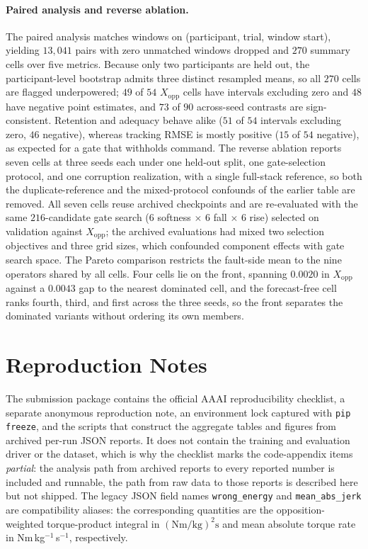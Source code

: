 \documentclass[letterpaper]{article}
\begin{document}
\paragraph{Paired analysis and reverse ablation.}
The paired analysis matches windows on (participant, trial, window start),
yielding $13{,}041$ pairs with zero unmatched windows dropped and $270$ summary
cells over five metrics. Because only two participants are held out, the
participant-level bootstrap admits three distinct resampled means, so all $270$
cells are flagged underpowered; $49$ of $54$ $X_{\mathrm{opp}}$ cells have
intervals excluding zero and $48$ have negative point estimates, and $73$ of
$90$ across-seed contrasts are sign-consistent. Retention and adequacy behave
alike ($51$ of $54$ intervals excluding zero, $46$ negative), whereas tracking
RMSE is mostly positive ($15$ of $54$ negative), as expected for a gate that
withholds command. The reverse ablation reports seven cells at three seeds each
under one held-out split, one gate-selection protocol, and one corruption
realization, with a single full-stack reference, so both the duplicate-reference
and the mixed-protocol confounds of the earlier table are removed. All seven
cells reuse archived checkpoints and are re-evaluated with the same
$216$-candidate gate search ($6$ softness $\times$ $6$ fall $\times$ $6$ rise)
selected on validation against $X_{\mathrm{opp}}$; the archived evaluations had
mixed two selection objectives and three grid sizes, which confounded component
effects with gate search space. The Pareto comparison restricts the fault-side
mean to the nine operators shared by all cells. Four cells lie on the front,
spanning $0.0020$ in $X_{\mathrm{opp}}$ against a $0.0043$ gap to the nearest
dominated cell, and the forecast-free cell ranks fourth, third, and first across
the three seeds, so the front separates the dominated variants without ordering
its own members.

\section{Reproduction Notes}

The submission package contains the official AAAI reproducibility checklist, a
separate anonymous reproduction note, an environment lock captured with
\texttt{pip freeze}, and the scripts that construct the aggregate tables and
figures from archived per-run JSON reports. It does not contain the training and
evaluation driver or the dataset, which is why the checklist marks the
code-appendix items \emph{partial}: the analysis path from archived reports to
every reported number is included and runnable, the path from raw data to those
reports is described here but not shipped.
The legacy JSON field names \texttt{wrong\_energy} and
\texttt{mean\_abs\_jerk} are compatibility aliases: the corresponding
quantities are the opposition-weighted torque-product integral in
$(\mathrm{Nm/kg})^2\mathrm{s}$ and mean absolute torque rate in
Nm\,kg$^{-1}$\,s$^{-1}$, respectively.
\end{document}
